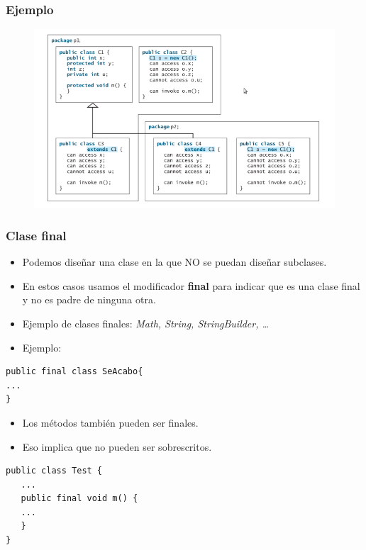 \documentclass{beamer}
\begin{document}
\begin{frame}
\frametitle{Ejemplo} 
\begin{figure}
\includegraphics[scale=0.5]{imagenes/ejemplo.png} 
\end{figure} 
\end{frame}

\begin{frame}[fragile]
\frametitle{Clase final}
\begin{itemize}[<+->]
\item Podemos diseñar una clase en la que NO se puedan diseñar subclases.
\item En estos casos usamos el modificador \textbf{final} para indicar que es una clase final y no es padre de ninguna otra.
\item Ejemplo de clases finales: \emph{Math, String, StringBuilder, \dots}
\item Ejemplo:
\end{itemize}
\pause
\begin{verbatim}
public final class SeAcabo{
...
}
\end{verbatim}
\pause
\begin{itemize}[<+->]
\item Los métodos también pueden ser finales.
\item Eso implica que no pueden ser sobrescritos. 
\end{itemize}
\pause
\begin{small}
\begin{verbatim}
public class Test {
   ...
   public final void m() {
   ...
   }
}
\end{verbatim}
\end{small}


\end{frame}
\end{document}
